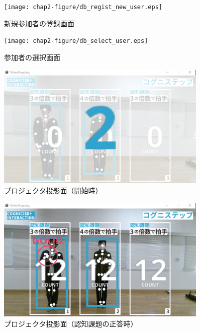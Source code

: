 \begin{figure}[tbp]
	\centering
			\texttt{[image: chap2-figure/db\_regist\_new\_user.eps]}
	\caption{新規参加者の登録画面}
	\label{fig:db_regist_new_user}
\end{figure}

\begin{figure}[tbp]
	\centering
			\texttt{[image: chap2-figure/db\_select\_user.eps]}
	\caption{参加者の選択画面}
	\label{fig:db_select_user}
\end{figure}

\begin{figure}[tbp]
	\centering
			\includegraphics[width=0.9\textwidth]{chap2-figure/vm_start.eps}
	\caption{プロジェクタ投影面（開始時）}
	\label{fig:vm_start}
\end{figure}

\begin{figure}[tbp]
	\centering
			\includegraphics[width=0.9\textwidth]{chap2-figure/vm_clap.eps}
	\caption{プロジェクタ投影面（認知課題の正答時）}
	\label{fig:vm_clap}
\end{figure}

